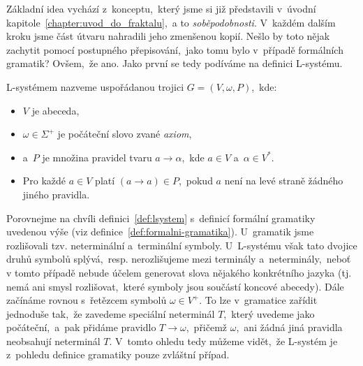 Základní idea vychází z~konceptu,~který jsme si již představili v~úvodní kapitole~\ref{chapter:uvod_do_fraktalu},~a to \emph{soběpodobnosti}. V~každém dalším kroku jsme část útvaru nahradili jeho zmenšenou kopií. Nešlo by toto nějak zachytit pomocí postupného přepisování,~jako tomu bylo v~případě formálních gramatik? Ovšem,~že ano. Jako první se tedy podíváme na definici L-systému.
\begin{definition}[L-systém]\label{def:lsystem}
    L-systémem nazveme uspořádanou trojici $G=(V,\omega,P)$,~kde:
    \begin{itemize}
        \item $V$ je abeceda,
        \item $\omega\in\Sigma^+$ je počáteční slovo zvané \emph{axiom},
        \item a~$P$ je množina pravidel tvaru $a\to\alpha$,~kde $a\in V$ a~$\alpha\in V^*$.
        \item Pro každé $a\in V$ platí $(a\to a)\in P$,~pokud $a$ není na levé straně žádného jiného pravidla.
    \end{itemize}
\end{definition}
Porovnejme na chvíli definici~\ref{def:lsystem} s~definicí formální gramatiky uvedenou výše (viz definice~\ref{def:formalni-gramatika}). U~gramatik jsme rozlišovali tzv. neterminální a~terminální symboly. U~L-systému však tato dvojice druhů symbolů splývá,~resp. nerozlišujeme mezi terminály a~neterminály,~neboť v tomto případě nebude účelem generovat slova nějakého konkrétního jazyka (tj. nemá ani smysl rozlišovat,~které symboly jsou součástí koncové abecedy). Dále začínáme rovnou s~řetězcem symbolů $\omega\in V^+$. To lze v~gramatice zařídit jednoduše tak,~že zavedeme speciální neterminál $T$,~který uvedeme jako počáteční,~a~pak přidáme pravidlo $T\to\omega$,~přičemž $\omega$,~ani žádná jiná pravidla neobsahují neterminál $T$. V~tomto ohledu tedy můžeme vidět,~že L-systém je z~pohledu definice gramatiky pouze zvláštní případ.

